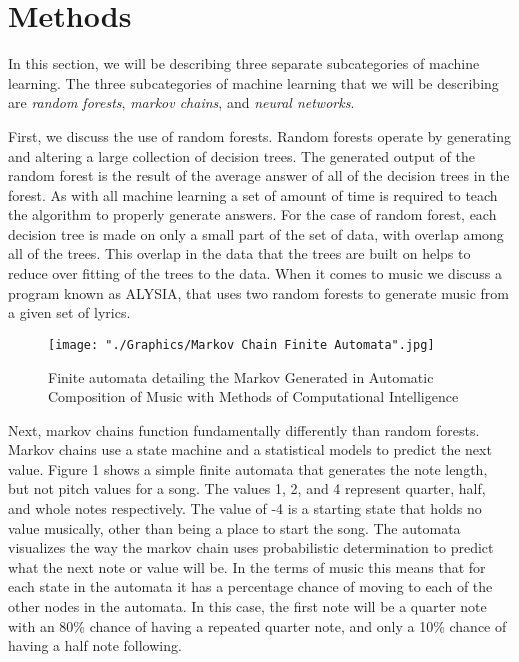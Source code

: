\documentclass{sig-alternate}
\begin{document}
\section{Methods}
\label{sec:methods}

	In this section, we will be describing three separate subcategories of machine learning. The three subcategories of machine learning that we will be describing are \textit{random forests},\textit{ markov chains}, and \textit{neural networks}.


	First, we discuss the use of random forests. Random forests operate by generating and altering a large collection of decision trees. The generated output of the random forest is the result of the average answer of all of the decision trees in the forest. As with all machine learning a set of amount of time is required to teach the algorithm to properly generate answers. For the case of random forest, each decision tree is made on only a small part of the set of data, with overlap among all of the trees. This overlap in the data that the trees are built on helps to reduce over fitting of the trees to the data. When it comes to music we discuss a program known as ALYSIA, that uses two random forests to generate music from a given set of lyrics.
\begin{figure}[H]
	\texttt{[image: "./Graphics/Markov Chain Finite Automata".jpg]}
	\caption{Finite automata detailing the Markov Generated in Automatic Composition of Music with Methods of Computational Intelligence}
	\label{fig:markovchain1}
\end{figure}
	Next, markov chains function fundamentally differently than random forests. Markov chains use a state machine and a statistical models to predict the next value. Figure 1 shows a simple finite automata that generates the note length, but not pitch values for a song. The values 1, 2, and 4 represent quarter, half, and whole notes respectively. The value of -4 is a starting state that holds no value musically, other than being a place to start the song. The automata visualizes the way the markov chain uses probabilistic determination to predict what the next note or value will be. In the terms of music this means that for each state in the automata it has a percentage chance of moving to each of the other nodes in the automata. In this case, the first note will be a quarter note with an 80\% chance of having a repeated quarter note, and only a 10\% chance of having a half note following.
\end{document}
